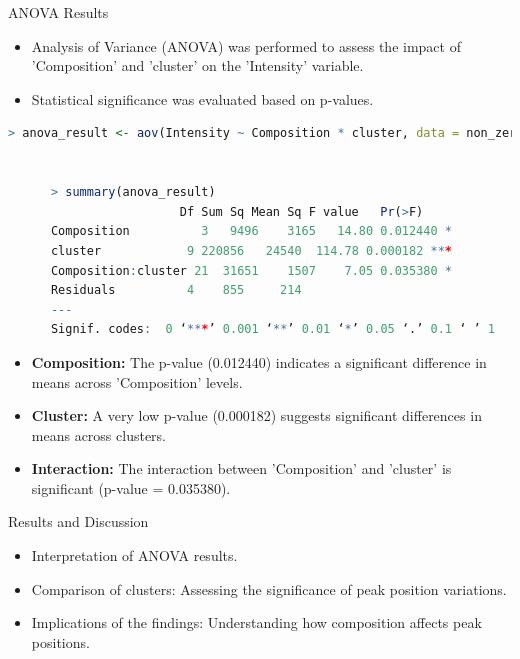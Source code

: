 \documentclass[aspectratio=169]{beamer}
\begin{document}
\begin{frame}[fragile]{ANOVA Results}
    \begin{itemize}
        \item Analysis of Variance (ANOVA) was performed to assess the impact of 'Composition' and 'cluster' on the 'Intensity' variable.
        \item Statistical significance was evaluated based on p-values.
    \end{itemize}

    \begin{lstlisting}[language=R, basicstyle=\tiny\ttfamily]
      > anova_result <- aov(Intensity ~ Composition * cluster, data = non_zero_data_long)


      > summary(anova_result)
                        Df Sum Sq Mean Sq F value   Pr(>F)    
      Composition          3   9496    3165   14.80 0.012440 *  
      cluster            9 220856   24540  114.78 0.000182 ***
      Composition:cluster 21  31651    1507    7.05 0.035380 *  
      Residuals          4    855     214                     
      ---
      Signif. codes:  0 ‘***’ 0.001 ‘**’ 0.01 ‘*’ 0.05 ‘.’ 0.1 ‘ ’ 1   
\end{lstlisting}

    \begin{itemize}
        \item \textbf{Composition:} The p-value (0.012440) indicates a significant difference in means across 'Composition' levels.
        \item \textbf{Cluster:} A very low p-value (0.000182) suggests significant differences in means across clusters.
        \item \textbf{Interaction:} The interaction between 'Composition' and 'cluster' is significant (p-value = 0.035380).
    \end{itemize}
\end{frame}



\begin{frame}{Results and Discussion}
    \begin{itemize}
        \item Interpretation of ANOVA results.
        \item Comparison of clusters: Assessing the significance of peak position variations.
        \item Implications of the findings: Understanding how composition affects peak positions.
    \end{itemize}
\end{frame}
\end{document}
